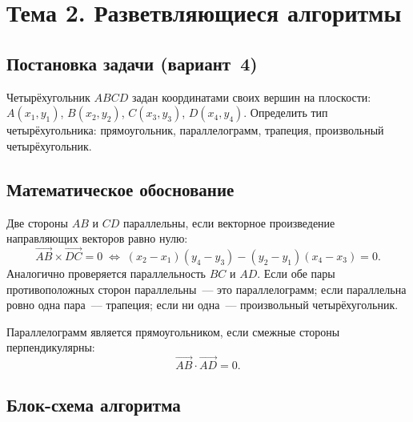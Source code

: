\section{Тема 2. Разветвляющиеся алгоритмы}

\subsection{Постановка задачи (вариант~4)}

Четырёхугольник $ABCD$ задан координатами своих вершин на плоскости:
$A(x_1,y_1)$, $B(x_2,y_2)$, $C(x_3,y_3)$, $D(x_4,y_4)$.
Определить тип четырёхугольника: прямоугольник, параллелограмм,
трапеция, произвольный четырёхугольник.

\subsection{Математическое обоснование}

Две стороны $AB$ и $CD$ параллельны, если векторное произведение
направляющих векторов равно нулю:
\[
  \vec{AB} \times \vec{DC} = 0
  \;\Leftrightarrow\;
  (x_2{-}x_1)(y_4{-}y_3) - (y_2{-}y_1)(x_4{-}x_3) = 0.
\]
Аналогично проверяется параллельность $BC$ и $AD$.
Если обе пары противоположных сторон параллельны~--- это
параллелограмм; если параллельна ровно одна пара~--- трапеция;
если ни одна~--- произвольный четырёхугольник.

Параллелограмм является прямоугольником, если смежные стороны
перпендикулярны:
\[
  \vec{AB} \cdot \vec{AD} = 0.
\]

\subsection{Блок-схема алгоритма}

